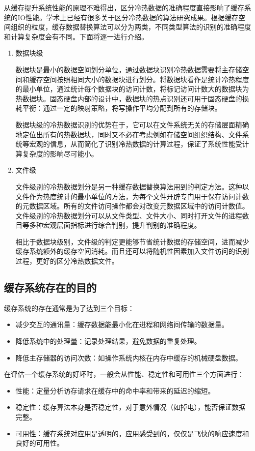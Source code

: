 从缓存提升系统性能的原理不难得出，区分冷热数据的准确程度直接影响了缓存系统的IO性能。学术上已经有很多关于区分冷热数据的算法研究成果。根据缓存空间组织的粒度，缓存数据替换算法可以分为两类，不同类型算法的识别的准确程度和计算复杂度会有不同。下面将逐一进行介绍。

\begin{enumerate}
\item 数据块级

数据块是最小的数据空间划分单位，通过数据块识别冷热数据需要将主存储空间和缓存空间按照相同大小的数据块进行划分。将数据块看作是统计冷热程度的最小单位，通过统计每个数据块的访问计数，将标记访问计数大的数据块为热数据块。固态硬盘内部的设计中，数据块的热点识别还可用于固态硬盘的损耗平衡：通过一定的映射策略，将写操作平均分配到所有的存储块。

数据块级的冷热数据识别的优势在于，它可以在文件系统无关的存储层面精确地定位出所有的热数据块，同时又不必在考虑例如存储空间组织结构、文件系统等宏观的信息，从而简化了识别冷热数据的计算过程，保证了系统性能受计算复杂度的影响尽可能小。

\item 文件级

文件级别的冷热数据划分\cite{linlin2011}是另一种缓存数据替换算法用到的判定方法。这种以文件作为热度统计的最小单位的方法，为每个文件开辟专门用于保存访问计数的元数据区域。所有的文件访问操作都会对改变元数据区域中的访问计数值。文件级别的冷热数据划分可以从文件类型、文件大小、同时打开文件的进程数目等多种宏观层面指标进行综合判别，提升判别的准确程度。

相比于数据块级别，文件级的判定更能够节省统计数据的存储空间，进而减少缓存系统额外的缓存空间消耗。而且还可以将随机性因素加入文件访问的识别过程，更好的区分冷热数据文件。
\end{enumerate}

\subsection{缓存系统存在的目的}
缓存系统的存在通常是为了达到三个目标：
\begin{itemize}
\item 减少交互的通讯量：缓存数据能最小化在进程和网络间传输的数据量。
\item 降低系统中的处理量：记录处理结果，避免数据的重复处理。
\item 降低主存储器的访问次数：如操作系统内核在内存中缓存的机械硬盘数据。
\end{itemize}

在评估一个缓存系统的好坏时，一般会从性能、稳定性和可用性三个方面进行：
\begin{itemize}
\item 性能：定量分析访存请求在缓存中的命中率和带来的延迟的缩短。
\item 稳定性：缓存算法本身是否稳定性，对于意外情况（如掉电），能否保证数据完整。
\item 可用性：缓存系统对应用是透明的，应用感受到的，仅仅是飞快的响应速度和良好的可用性。
\end{itemize}


